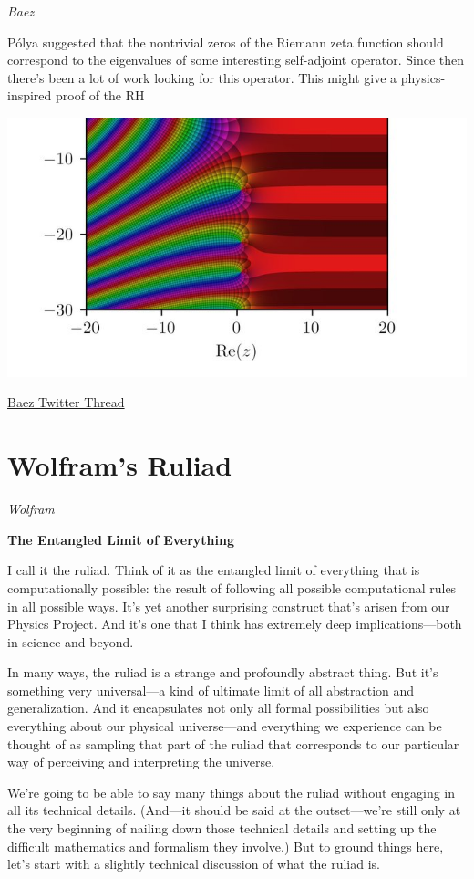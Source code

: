 \documentclass[
]{book}
\begin{document}
\emph{Baez}

Pólya suggested that the nontrivial zeros of the Riemann zeta function should correspond to the eigenvalues of some interesting self-adjoint operator. Since then there's been a lot of work looking for this operator. This might give a physics-inspired proof of the RH

\includegraphics{fig/riemann_zeta.jpeg}

\href{https://twitter.com/johncarlosbaez/status/1404119086062178307}{Baez Twitter Thread}

\hypertarget{wolframs-ruliad}{%
\section{Wolfram's Ruliad}\label{wolframs-ruliad}}

\emph{Wolfram}

\textbf{The Entangled Limit of Everything}

I call it the ruliad. Think of it as the entangled limit of everything that is computationally possible: the result of following all possible computational rules in all possible ways. It's yet another surprising construct that's arisen from our Physics Project. And it's one that I think has extremely deep implications---both in science and beyond.

In many ways, the ruliad is a strange and profoundly abstract thing. But it's something very universal---a kind of ultimate limit of all abstraction and generalization. And it encapsulates not only all formal possibilities but also everything about our physical universe---and everything we experience can be thought of as sampling that part of the ruliad that corresponds to our particular way of perceiving and interpreting the universe.

We're going to be able to say many things about the ruliad without engaging in all its technical details. (And---it should be said at the outset---we're still only at the very beginning of nailing down those technical details and setting up the difficult mathematics and formalism they involve.) But to ground things here, let's start with a slightly technical discussion of what the ruliad is.
\end{document}
